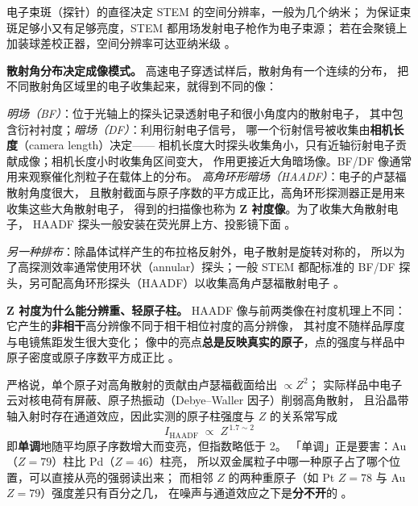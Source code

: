 电子束斑（探针）的直径决定 STEM 的空间分辨率，一般为几个纳米；
为保证束斑足够小又有足够亮度，STEM 都用场发射电子枪作为电子束源；
若在会聚镜上加装球差校正器，空间分辨率可达亚纳米级
。

\begin{principle}
\textbf{散射角分布决定成像模式。} 高速电子穿透试样后，散射角有一个连续的分布，
把不同散射角区域里的电子收集起来，就得到不同的像：

\emph{明场（BF）}：位于光轴上的探头记录透射电子和很小角度内的散射电子，
其中包含衍衬衬度；\emph{暗场（DF）}：利用衍射电子信号，
哪一个衍射信号被收集由\textbf{相机长度}（camera length）决定——
相机长度大时探头收集角小，只有近轴衍射电子贡献成像；相机长度小时收集角区间变大，
作用更接近大角暗场像。BF/DF 像通常用来观察催化剂粒子在载体上的分布。
\emph{高角环形暗场（HAADF）}：电子的卢瑟福散射角度很大，
且散射截面与原子序数的平方成正比，高角环形探测器正是用来收集这些大角散射电子，
得到的扫描像也称为 \textbf{Z 衬度像}。为了收集大角散射电子，
HAADF 探头一般安装在荧光屏上方、投影镜下面
。

\emph{另一种排布}：除晶体试样产生的布拉格反射外，电子散射是旋转对称的，
所以为了高探测效率通常使用环状（annular）探头；一般 STEM 都配标准的
BF/DF 探头，另可配高角环形探头（HAADF）以收集高角卢瑟福散射电子
。
\end{principle}

\begin{principle}
\textbf{Z 衬度为什么能分辨重、轻原子柱。} HAADF 像与前两类像在衬度机理上不同：
它产生的\textbf{非相干}高分辨像不同于相干相位衬度的高分辨像，
其衬度不随样品厚度与电镜焦距发生很大变化；
像中的亮点\textbf{总是反映真实的原子}，点的强度与样品中原子密度或原子序数平方成正比
。

严格说，单个原子对高角散射的贡献由卢瑟福截面给出 $\propto Z^{2}$；
实际样品中电子云对核电荷有屏蔽、原子热振动（Debye--Waller 因子）削弱高角散射，
且沿晶带轴入射时存在通道效应，因此实测的原子柱强度与 $Z$ 的关系常写成
\begin{equation}
I_{\mathrm{HAADF}}\;\propto\;Z^{\,1.7\sim 2}
\label{eq:ch02b-zcontrast}
\end{equation}
即\textbf{单调}地随平均原子序数增大而变亮，但指数略低于 2。
「单调」正是要害：Au（$Z=79$）柱比 Pd（$Z=46$）柱亮，
所以双金属粒子中哪一种原子占了哪个位置，可以直接从亮的强弱读出来；
而相邻 $Z$ 的两种重原子（如 Pt $Z=78$ 与 Au $Z=79$）强度差只有百分之几，
在噪声与通道效应之下是\textbf{分不开}的
。
\end{principle}

